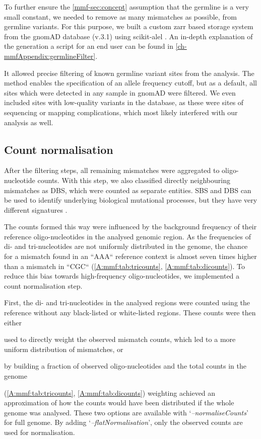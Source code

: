 To further ensure the \autoref{mmf-sec:concept} assumption that the germline is a very small constant, we needed to remove as many mismatches as possible,  from germline variants. For this purpose, we built a custom zarr \cite{Miles2021} based storage system from the gnomAD database (v.3.1) \cite{Karczewski2020} using scikit-alel \cite{Miles2021a}.
An in-depth explanation of the generation  a script for an end user can be found in \autoref{ch-mmfAppendix:germlineFilter}.

It allowed precise filtering of known germline variant sites from the analysis. The method enables the specification of an allele frequency cutoff, but as a default, all sites which were detected in any sample in gnomAD were filtered. We even included sites with low-quality variants in the database, as these were sites of sequencing or mapping complications, which most likely interfered with our analysis as well.


\subsection[Count normalisation]{Count normalisation}
\label{mmf-sec:countNorm}
After the filtering steps, all remaining mismatches were aggregated to oligo-nucleotide counts. With this step, we also classified directly neighbouring mismatches as DBS, which were counted as separate entities. SBS and DBS can be used to identify underlying biological mutational processes, but they have very different  signatures \cite{Alexandrov2020}.
 
The counts formed this way were influenced by the background frequency of their reference oligo-nucleotides in the analysed genomic region. As the frequencies of di- and tri-nucleotides are not uniformly distributed in the genome, the chance for a mismatch found in an ``AAA`` reference context is almost seven times higher than a mismatch in ``CGC`` (\autoref{A:mmf:tab:tricounts}, \autoref{A:mmf:tab:dicounts}). To reduce this bias towards high-frequency oligo-nucleotides, we implemented a count normalisation step.

First, the di- and tri-nucleotides in the analysed regions were counted using the reference without any black-listed or white-listed regions. These counts were then either \begin{enumerate*}[label={(\roman*)}]
 \item used to directly weight the observed mismatch counts, which led to a more uniform distribution of mismatches, or
 \item by building a fraction of observed oligo-nucleotides and the total counts in the genome
\end{enumerate*} (\autoref{A:mmf:tab:tricounts}, \autoref{A:mmf:tab:dicounts}) weighting achieved an approximation of how the counts would have been distributed if the whole genome was analysed. These two options are available with \lq\emph{--normaliseCounts}\rq~ for  full genome. By  adding \lq\emph{--flatNormalisation}\rq, only the observed counts are used for normalisation.

